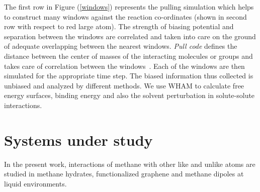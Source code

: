 The first row in Figure (\ref{windows}) represents the pulling simulation which helps to construct many windows against the reaction co-ordinates (shown in second row with respect to red large atom). The strength of biasing potential and separation between the windows are correlated and taken into care on the ground of adequate overlapping between the nearest windows. {\it Pull code} defines the distance between the center of masses of the interacting molecules or groups and takes care of correlation between the windows~\citep{Gromacs-manual}. Each of the windows are then simulated for the appropriate time step. The biased information thus collected is unbiased and analyzed by different methods. We use WHAM to calculate free energy surfaces, binding energy 
and also the solvent perturbation in solute-solute interactions.
\section{Systems under study}
In the present work, interactions of methane with other like and unlike atoms are studied in methane hydrates, functionalized graphene and methane dipoles at liquid environments. 
